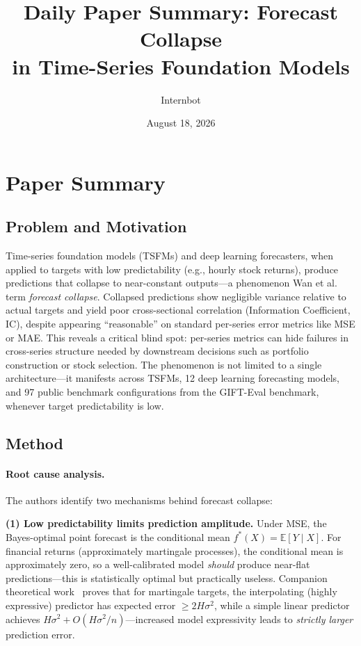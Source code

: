 \documentclass[11pt,a4paper]{article}
\title{Daily Paper Summary: Forecast Collapse\\in Time-Series Foundation Models}
\author{Internbot}
\date{August 18, 2026}
\begin{document}
\maketitle

\section{Paper Summary}

\subsection{Problem and Motivation}

Time-series foundation models (TSFMs) and deep learning forecasters, when applied to targets with low predictability (e.g., hourly stock returns), produce predictions that collapse to near-constant outputs---a phenomenon Wan et al.~\cite{forecastcollapse2026} term \emph{forecast collapse}. Collapsed predictions show negligible variance relative to actual targets and yield poor cross-sectional correlation (Information Coefficient, IC), despite appearing ``reasonable'' on standard per-series error metrics like MSE or MAE. This reveals a critical blind spot: per-series metrics can hide failures in cross-series structure needed by downstream decisions such as portfolio construction or stock selection. The phenomenon is not limited to a single architecture---it manifests across TSFMs, 12 deep learning forecasting models, and 97 public benchmark configurations from the GIFT-Eval benchmark, whenever target predictability is low.

\subsection{Method}

\paragraph{Root cause analysis.} The authors identify two mechanisms behind forecast collapse:

\textbf{(1) Low predictability limits prediction amplitude.} Under MSE, the Bayes-optimal point forecast is the conditional mean $f^*(X) = \mathbb{E}[Y \mid X]$. For financial returns (approximately martingale processes), the conditional mean is approximately zero, so a well-calibrated model \emph{should} produce near-flat predictions---this is statistically optimal but practically useless. Companion theoretical work~\cite{andreoletti2026} proves that for martingale targets, the interpolating (highly expressive) predictor has expected error $\geq 2H\sigma^2$, while a simple linear predictor achieves $H\sigma^2 + O(H\sigma^2/n)$---increased model expressivity leads to \emph{strictly larger} prediction error.
\end{document}
